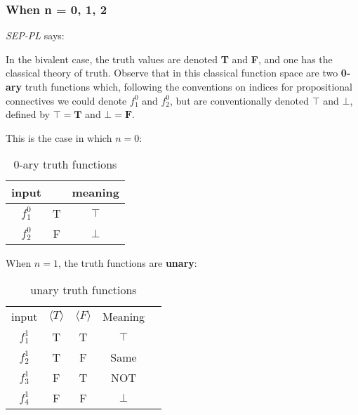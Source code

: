 \documentclass[12pt, letterpaper]{article}
\begin{document}
\subsubsection{When n = 0, 1, 2}

\textit{SEP-PL} says:

\begin{displayquote}
  In the bivalent case, the truth values are denoted \textbf{T} and \textbf{F},
  and one has the classical theory of truth. Observe that in this classical
  function space are two \textbf{0-ary} truth functions which, following the
  conventions on indices for propositional connectives we could denote $f_1^0$
  and $f_2^0$, but are conventionally denoted $\top$ and $\bot$, defined by
  $\top = \textbf{T}$ and $\bot = \textbf{F}$.
\end{displayquote}

This is the case in which $n = 0$:

\begin{table}[H]
  \centering
  \begin{tabular}{|c|c|c|}
    \hline
    input   &   & meaning \\ [1ex] \hline
    $f_1^0$ & T & $\top$  \\ [0.5ex] \hline
    $f_2^0$ & F & $\bot$  \\ [0.5ex] \hline
  \end{tabular}
  \caption{0-ary truth functions}
\end{table}

When $n = 1$, the truth functions are \textbf{unary}:

\begin{table}[H]
  \centering
  \begin{tabular}{|c|c|c|c|c}
    \cline{1-4}
    input   & $\langle T \rangle$ & $\langle F \rangle$ & Meaning & \\ [1ex] \cline{1-4}
    $f_1^1$ & T                   & T                   & $\top$  & \\ [0.5ex] \cline{1-4}
    $f_2^1$ & T                   & F                   & Same    & \\ [0.5ex] \cline{1-4}
    $f_3^1$ & F                   & T                   & NOT     & \\ [0.5ex] \cline{1-4}
    $f_4^1$ & F                   & F                   & $\bot$  & \\ [0.5ex] \cline{1-4}
  \end{tabular}
  \caption{unary truth functions}
\end{table}
\end{document}
